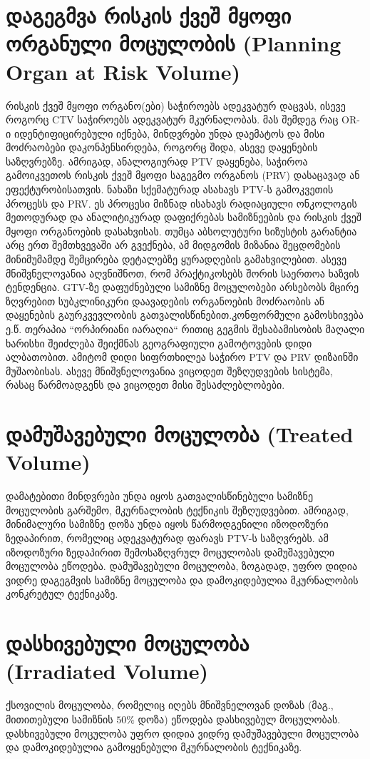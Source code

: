 \documentclass[12pt,a4paper,]{report}
\begin{document}
\section{დაგეგმვა რისკის ქვეშ მყოფი ორგანული მოცულობის (Planning Organ at Risk Volume)}
რისკის ქვეშ მყოფი ორგანო(ები) საჭიროებს ადეკვატურ დაცვას, ისევე როგორც CTV საჭიროებს  ადეკვატურ მკურნალობას. მას შემდეგ რაც OR-ი იდენტიფიცირებული იქნება, მინდვრები უნდა დაემატოს და მისი მოძრაობები დაკონპენსირდება, როგორც შიდა, ასევე დაყენების საზღვრებზე. ამრიგად, ანალოგიურად PTV დაყენება, საჭიროა გამოიკვეთოს რისკის ქვეშ მყოფი საგეგმო ორგანოს (PRV) დასაცავად ან ეფექტურობისათვის. ნახაზი სქემატურად ასახავს PTV-ს გამოკვეთის პროცესს და PRV. ეს პროცესი მიზნად ისახავს რადიაციული ონკოლოგის მეთოდურად და ანალიტიკურად დაფიქრებას სამიზნეების და რისკის ქვეშ მყოფი ორგანოების დასახვისას. თუმცა აბსოლუტური სიზუსტის გარანტია არც ერთ შემთხვევაში არ გვექნება, ამ მიდგომის მიზანია შეცდომების მინიმუმამდე შემცირება დეტალებზე ყურადღების გამახვილებით. ასევე მნიშვნელოვანია აღვნიშნოთ, რომ პრაქტიკოსებს შორის საერთოა ხაზვის ტენდენცია.
GTV-ზე დაფუძნებული სამიზნე მოცულობები არსებობს მცირე ზღვრებით სუბკლინიკური დაავადების ორგანოების მოძრაობის ან დაყენების გაურკვევლობის გათვალისწინებით.კონფორმული გამოსხივება ე.წ. თერაპია “ორპირიანი იარაღია“ რითიც გეგმის შესაბამისობის მაღალი ხარისხი შეიძლება შეიქმნას გეოგრაფიული გამოტოვების დიდი ალბათობით.  ამიტომ დიდი სიფრთხილეა საჭირო PTV და PRV დიზაინში მუშაობისას. ასევე მნიშვნელოვანია ვიცოდეთ შეზღუდვების სისტემა, რასაც წარმოადგენს და ვიცოდეთ მისი შესაძლებლობები.

\section{დამუშავებული მოცულობა (Treated Volume)}
დამატებითი მინდვრები უნდა იყოს გათვალისწინებული სამიზნე მოცულობის გარშემო, მკურნალობის ტექნიკის შეზღუდვებით. ამრიგად, მინიმალური სამიზნე დოზა უნდა იყოს წარმოდგენილი იზოდოზური ზედაპირით, რომელიც ადეკვატურად ფარავს PTV-ს საზღვრებს. ამ იზოდოზური ზედაპირით შემოსაზღვრულ მოცულობას დამუშავებული მოცულობა ეწოდება. დამუშავებული მოცულობა, ზოგადად, უფრო დიდია ვიდრე დაგეგმვის სამიზნე მოცულობა და დამოკიდებულია მკურნალობის კონკრეტულ ტექნიკაზე.

\section{დასხივებული მოცულობა (Irradiated Volume)}
ქსოვილის მოცულობა, რომელიც იღებს მნიშვნელოვან დოზას (მაგ., მითითებული სამიზნის $50\%$ დოზა) ეწოდება დასხივებულ მოცულობას. დასხივებული მოცულობა უფრო დიდია ვიდრე დამუშავებული მოცულობა და დამოკიდებულია გამოყენებული მკურნალობის ტექნიკაზე.
\end{document}
